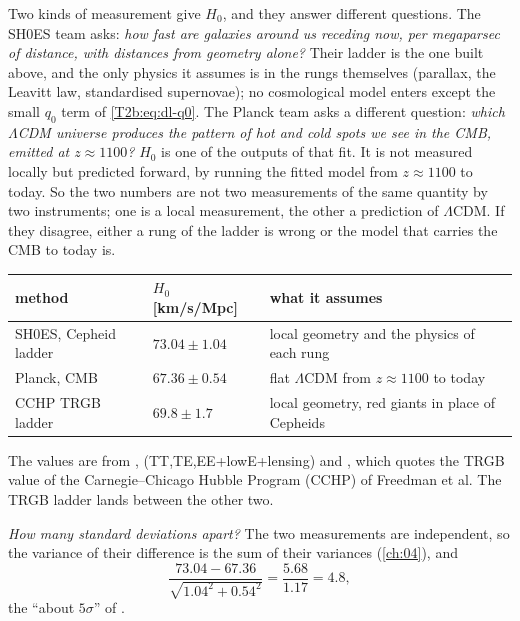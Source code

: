 Two kinds of measurement give $H_0$, and they answer different questions. The SH0ES team asks: \emph{how fast are galaxies around us receding now, per megaparsec of distance, with distances from geometry alone?} Their ladder is the one built above, and the only physics it assumes is in the rungs themselves (parallax, the Leavitt law, standardised supernovae); no cosmological model enters except the small $q_0$ term of \eqref{T2b:eq:dl-q0}. The Planck team asks a different question: \emph{which $\Lambda$CDM universe produces the pattern of hot and cold spots we see in the CMB, emitted at $z\approx1100$?} $H_0$ is one of the outputs of that fit. It is not measured locally but predicted forward, by running the fitted model from $z\approx1100$ to today. So the two numbers are not two measurements of the same quantity by two instruments; one is a local measurement, the other a prediction of $\Lambda$CDM. If they disagree, either a rung of the ladder is wrong or the model that carries the CMB to today is.

\begin{center}
\small
\begin{tabular}{@{}lll@{}}
\toprule
method & $H_0$ [km/s/Mpc] & what it assumes\\
\midrule
SH0ES, Cepheid ladder & $73.04\pm1.04$ & local geometry and the physics of each rung\\
Planck, CMB & $67.36\pm0.54$ & flat $\Lambda$CDM from $z\approx1100$ to today\\
CCHP TRGB ladder & $69.8\pm1.7$ & local geometry, red giants in place of Cepheids\\
\bottomrule
\end{tabular}
\end{center}

\noindent The values are from \cite{Riess2022SH0ES}, \cite[Table~2]{Planck2018VI} (TT,TE,EE+lowE+lensing) and \cite[Sec.~IV.A]{Abdalla2022}, which quotes the TRGB value of the Carnegie--Chicago Hubble Program (CCHP) of Freedman et al. The TRGB ladder lands between the other two.

\emph{How many standard deviations apart?} The two measurements are independent, so the variance of their difference is the sum of their variances (\cref{ch:04}), and
\[
  \frac{73.04-67.36}{\sqrt{1.04^2+0.54^2}}=\frac{5.68}{1.17}=4.8 ,
\]
the ``about $5\sigma$'' of \cite[Sec.~IV.A]{Abdalla2022}.


